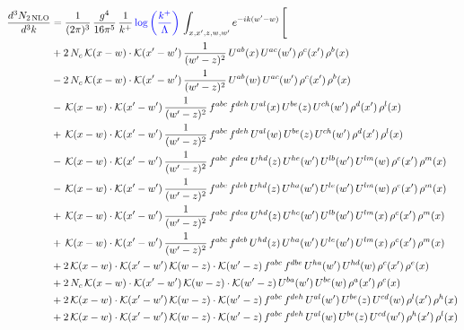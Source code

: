 \documentclass[9pt]{article}
\numberwithin{equation}{section}
\begin{document}
\begin{align}
\frac{d^{3}N_{2\,\mathrm{NLO}}}{d^{3}k} & = \frac{1}{(2\pi)^{3}}\,\frac{g^{4}}{16\pi^{5}}\,\frac{1}{k^{+}}\,{\color{blue}\log{\left(\frac{k^{+}}{\Lambda}\right)}}\,\int_{x,x',z,w,w'}e^{-ik(w'-w)}\,\Bigg[
\notag \\ &+2\,N_{c}\,\mathcal{K}(x-w)\cdot\mathcal{K}(x'-w')\,\frac{1}{(w'-z)^{2}}\,U^{ab}(x)\,U^{ac}(w')\,\rho^{c}(x')\,\rho^{b}(x)\notag\\
&-2\,N_{c}\,\mathcal{K}(x-w)\cdot\mathcal{K}(x'-w')\,\frac{1}{(w'-z)^{2}}\,U^{ab}(w)\,U^{ac}(w')\,\rho^{c}(x')\,\rho^{b}(x)\notag\\
&-\,\mathcal{K}(x-w)\cdot\mathcal{K}(x'-w')\,\frac{1}{(w'-z)^{2}}\,f^{abc}\,f^{deh}\,U^{al}(x)\,U^{be}(z)\,U^{ch}(w')\,\rho^{d}(x')\,\rho^{l}(x)\notag\\
&+\,\mathcal{K}(x-w)\cdot\mathcal{K}(x'-w')\,\frac{1}{(w'-z)^{2}}\,f^{abc}\,f^{deh}\,U^{al}(w)\,U^{be}(z)\,U^{ch}(w')\,\rho^{d}(x')\,\rho^{l}(x)\notag \\ & -\,\mathcal{K}(x-w)\cdot\mathcal{K}(x'-w')\,\frac{1}{(w'-z)^{2}}\,f^{abc}\,f^{dea}\,U^{hd}(z)\,U^{he}(w')\,U^{lb}(w')\,U^{lm}(w)\,\rho^{c}(x')\,\rho^{m}(x)\notag\\
&-\,\mathcal{K}(x-w)\cdot\mathcal{K}(x'-w')\,\frac{1}{(w'-z)^{2}}\,f^{abc}\,f^{deb}\,U^{hd}(z)\,U^{ha}(w')\,U^{le}(w')\,U^{lm}(w)\,\rho^{c}(x')\,\rho^{m}(x)\notag\\
&+\,\mathcal{K}(x-w)\cdot\mathcal{K}(x'-w')\,\frac{1}{(w'-z)^{2}}\,f^{abc}\,f^{dea}\,U^{hd}(z)\,U^{he}(w')\,U^{lb}(w')\,U^{lm}(x)\,\rho^{c}(x')\,\rho^{m}(x)\notag\\
&+\,\mathcal{K}(x-w)\cdot\mathcal{K}(x'-w')\,\frac{1}{(w'-z)^{2}}\,f^{abc}\,f^{deb}\,U^{hd}(z)\,U^{ha}(w')\,U^{le}(w')\,U^{lm}(x)\,\rho^{c}(x')\,\rho^{m}(x)\notag\\
&+2\,\mathcal{K}(x-w)\cdot\mathcal{K}(x'-w')\,\mathcal{K}(w-z)\cdot\mathcal{K}(w'-z)\,f^{abc}\,f^{dbe}\,U^{ha}(w')\,U^{hd}(w)\,\rho^{c}(x')\,\rho^{e}(x)\notag\\
&+2\,N_{c}\,\mathcal{K}(x-w)\cdot\mathcal{K}(x'-w')\,\mathcal{K}(w-z)\cdot\mathcal{K}(w'-z)\,U^{ba}(w')\,U^{bc}(w)\,\rho^{a}(x')\,\rho^{c}(x)\notag \\ & +2\,\mathcal{K}(x-w)\cdot\mathcal{K}(x'-w')\,\mathcal{K}(w-z)\cdot\mathcal{K}(w'-z)\,f^{abc}\,f^{deh}\,U^{al}(w')\,U^{be}(z)\,U^{cd}(w)\,\rho^{l}(x')\,\rho^{h}(x)\notag\\
&+2\,\mathcal{K}(x-w)\cdot\mathcal{K}(x'-w')\,\mathcal{K}(w-z)\cdot\mathcal{K}(w'-z)\,f^{abc}\,f^{deh}\,U^{al}(w)\,U^{be}(z)\,U^{cd}(w')\,\rho^{h}(x')\,\rho^{l}(x)\notag\\

\end{align}
\end{document}
